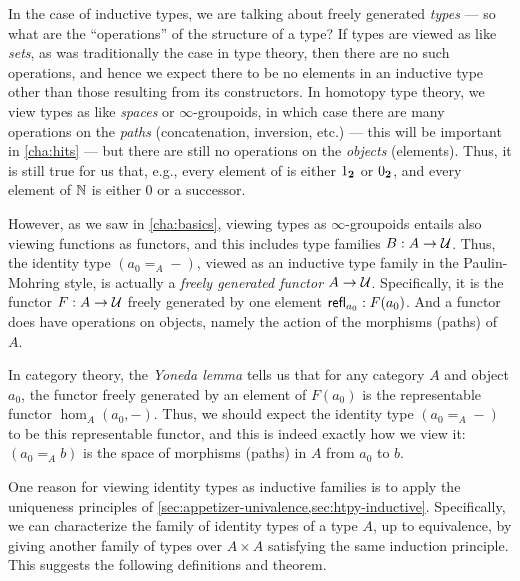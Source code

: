 In the case of inductive types, we are talking about freely generated \emph{types} --- so what are the ``operations'' of the structure of a type?
If types are viewed as like \emph{sets}, as was traditionally the case in type theory, then there are no such operations, and hence we expect there to be no elements in an inductive type other than those resulting from its constructors.
In homotopy type theory, we view types as like \emph{spaces} or $\infty$-groupoids, in which case there are many operations on the \emph{paths} (concatenation, inversion, etc.) --- this will be important in \autoref{cha:hits} --- but there are still no operations on the \emph{objects} (elements).
Thus, it is still true for us that, e.g., every element of \bool is either ${1_{\mathbf{2}}}$ or ${0_{\mathbf{2}}}$, and every element of $\mathbb{N}$ is either $0$ or a successor.

However, as we saw in \autoref{cha:basics}, viewing types as $\infty$-groupoids entails also viewing functions as functors, and this includes type families $B:A\to\mathcal{U}$.
Thus, the identity type $(a_0 =_A -)$, viewed as an inductive type family in the Paulin-Mohring style, is actually a \emph{freely generated functor} $A\to\mathcal{U}$.
Specifically, it is the functor $F:A\to\mathcal{U}$ freely generated by one element $\mathsf{refl}_{a_0}: F(a_0)$.
And a functor does have operations on objects, namely the action of the morphisms (paths) of $A$.

In category theory, the \emph{Yoneda lemma} tells us that for any category $A$ and object $a_0$, the functor freely generated by an element of $F(a_0)$ is the representable functor $\hom_A(a_0,-)$.
Thus, we should expect the identity type $(a_0 =_A -)$ to be this representable functor, and this is indeed exactly how we view it: $(a_0 =_A b)$ is the space of morphisms (paths) in $A$ from $a_0$ to $b$.

\medskip

One reason for viewing identity types as inductive families is to apply the uniqueness principles of \autoref{sec:appetizer-univalence,sec:htpy-inductive}.
Specifically, we can characterize the family of identity types of a type $A$, up to equivalence, by giving another family of types over $A\times A$ satisfying the same induction principle.
This suggests the following definitions and theorem.

